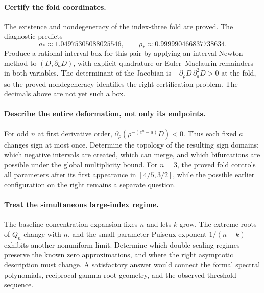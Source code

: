\paragraph{Certify the fold coordinates.}
The existence and nondegeneracy of the index-three fold are proved.
The diagnostic predicts
\[
 a_*\approx1.04975305088025546,\qquad
 \rho_*\approx0.999990466837738634.
\]
Produce a rational interval box for this pair by applying an interval
Newton method to $(D,\partial_aD)$, with explicit quadrature or
Euler--Maclaurin remainders in both variables. The determinant of the
Jacobian is $-\partial_\rho D\,\partial_a^2D>0$ at the fold, so the
proved nondegeneracy identifies the right certification problem. The
decimals above are not yet such a box.

\paragraph{Describe the entire deformation, not only its endpoints.}
For odd $n$ at first derivative order,
$\partial_\rho(\rho^{-(e^n-a)}D)<0$. Thus each fixed $a$ changes sign
at most once. Determine the topology of the resulting sign domains:
which negative intervals are created, which can merge, and which
bifurcations are possible under the global multiplicity bound. For
$n=3$, the proved fold controls all parameters after its first appearance
in $[4/5,3/2]$, while the possible earlier configuration on the right
remains a separate question.

\paragraph{Treat the simultaneous large-index regime.}
The baseline concentration expansion fixes $n$ and lets $k$ grow.
The extreme roots of $Q_n$ change with $n$, and the small-parameter
Puiseux exponent $1/(n-k)$ exhibits another nonuniform limit. Determine
which double-scaling regimes preserve the known zero approximations,
and where the right asymptotic description must change. A satisfactory
answer would connect the formal spectral polynomials, reciprocal-gamma
root geometry, and the observed threshold sequence.
